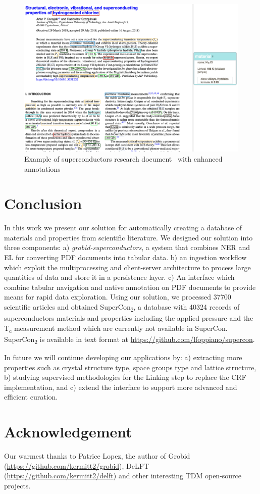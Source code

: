 \documentclass{article}
\begin{document}
\begin{figure}[ht]
\includegraphics[width=\textwidth]{sample-pdf-annotations}
\caption{\label{fig:pdf-annotations} Example of superconductors research document~\cite{sample_superconductors_article} with enhanced annotations}
\end{figure}

\section{Conclusion}
\label{sec:conclusion}
In this work we present our solution for automatically creating a database of materials and properties from scientific literature. 
We designed our solution into three components: a) \textit{grobid-superconductors}, a system that combines NER and EL for converting PDF documents into tabular data. b) an ingestion workflow which exploit the multiprocessing and client-server architecture to process large quantities of data and store it in a persistence layer. c) An interface which combine tabular navigation and native annotation on PDF documents to provide means for rapid data exploration. 
Using our solution, we processed 37700 scientific articles and obtained SuperCon\textsubscript{2}, a database with 40324 records of superconductors materials and properties including the applied pressure and the T\textsubscript{c} measurement method which are currently not available in SuperCon. 
SuperCon\textsubscript{2} is available in text format at \url{https://github.com/lfoppiano/supercon}.

In future we will continue developing our applications by: a) extracting more properties such as crystal structure type, space groups type and lattice structure, b) studying supervised methodologies for the Linking step to replace the CRF implementation, and c) extend the interface to support more advanced and efficient curation.


\section{Acknowledgement}
\label{sec:acknowledgement}
Our warmest thanks to Patrice Lopez, the author of Grobid (\url{https://github.com/kermitt2/grobid}), DeLFT (\url{https://github.com/kermitt2/delft}) and other interesting TDM open-source projects.



\end{document}
